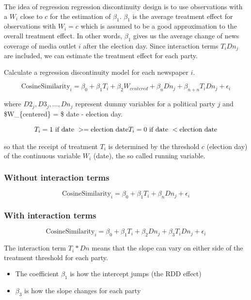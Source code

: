 \documentclass[
]{article}
\providecommand{\tightlist}{%
  \setlength{\itemsep}{0pt}\setlength{\parskip}{0pt}}
\begin{document}
The idea of regression regression discontinuity design is to use
observations with a \(W_i\) close to \(c\) for the estimation of
\(\beta_1\). \(\beta_1\) is the average treatment effect for
observations with \(W_i = c\) which is assumed to be a good
approximation to the overall treatment effect. In other words,
\(\beta_1\) gives us the average change of news coverage of media outlet
\(i\) after the election day. Since interaction terms \(T_iDn_{j}\) are
included, we can estimate the treatment effect for each party.

Calculate a regression discontinuity model for each newspaper \(i\).

\[
\text{CosineSimilarity}_{i}=\beta_0+\beta_1T_i+\beta_2W_{centered}+\beta_nDn_{j}+\beta_{n+n}T_iDn_{j}+\epsilon_i
\]

where \(D2_{j}, D3_{j}, ... ,Dn_{j}\) represent dummy variables for a
political party \(j\) and \$W\_\{centered\} = \$ date - election day.

\[
T_i = 1 \text{ if date } >= \text{election date} \\
T_i = 0 \text{ if date } < \text{election date}
\]

so that the receipt of treatment \(T_i\) is determined by the threshold
\(c\) (election day) of the continuous variable \(W_i\) (date), the so
called running variable.

\hypertarget{without-interaction-terms}{%
\subsubsection{Without interaction
terms}\label{without-interaction-terms}}

\[
\text{CosineSimilarity}_{i}=\beta_0+\beta_1T_i+\beta_nDn_{j}+\epsilon_i
\]

\hypertarget{with-interaction-terms}{%
\subsubsection{With interaction terms}\label{with-interaction-terms}}

\[
\text{CosineSimilarity}_{i}=\beta_0+\beta_1T_i+\beta_2Dn_{j}+\beta_3T_iDn_{j}+\epsilon_i
\]

The interaction term \(T_i*Dn\) means that the slope can vary on either
side of the treatment threshold for each party.

\begin{itemize}
\tightlist
\item
  The coefficient \(\beta_1\) is how the intercept jumps (the RDD
  effect)
\item
  \(\beta_3\) is how the slope changes for each party
\end{itemize}
\end{document}
